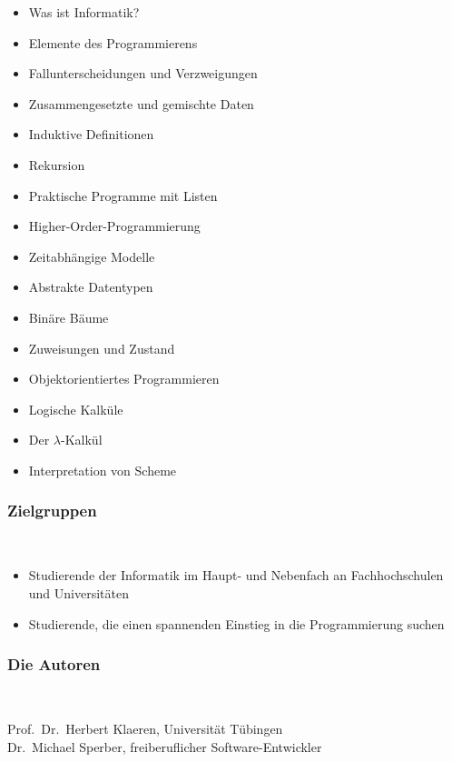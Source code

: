 \documentclass{tueteubner}
\begin{document}
\begin{minipage}[t]{0.5\textwidth}
\begin{itemize}
\item Was ist Informatik?
\item Elemente des Programmierens
\item Fallunterscheidungen und Verzweigungen
\item Zusammengesetzte und gemischte Daten
\item Induktive Definitionen
\item Rekursion
\item Praktische Programme mit Listen
\item Higher-Order-Programmierung
\end{itemize}
\end{minipage}
\qquad
\begin{minipage}[t]{0.5\textwidth}
\begin{itemize}
\item Zeitabhängige Modelle
\item Abstrakte Datentypen
\item Bin\"are B\"aume
\item Zuweisungen und Zustand
\item Objektorientiertes Programmieren
\item Logische Kalk\"ule
\item Der $\lambda $-Kalk\"ul
\item Interpretation von Scheme
\end{itemize}
\end{minipage}

\subsubsection*{Zielgruppen}~

\vspace*{-2ex}

\begin{itemize}
\item Studierende der Informatik im Haupt- und Nebenfach an
  Fachhochschulen und Universitäten
\item Studierende, die einen spannenden Einstieg in die Programmierung
  suchen
\end{itemize}

\vspace{-2.5ex}

\subsubsection*{Die Autoren}~

\vspace*{-0.5ex}

Prof.~Dr.~Herbert Klaeren, Universität Tübingen\\
Dr.~Michael Sperber, freiberuflicher Software-Entwickler

\vfill
\end{document}
